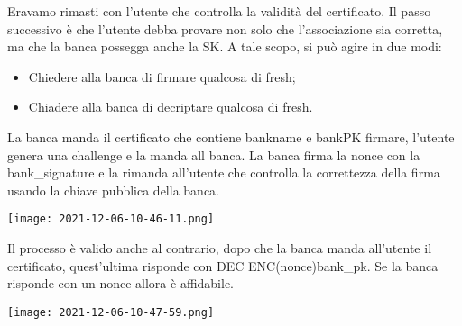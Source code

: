 \documentclass{article}
\theoremstyle{remark}
\begin{document}
Eravamo rimasti con l'utente che controlla la validità del certificato. Il passo successivo è che l'utente debba provare non solo che l'associazione sia corretta, ma che la banca possegga anche la SK. A tale scopo, si può agire in due modi:\begin{itemize}
	\item Chiedere alla banca di firmare qualcosa di fresh;
	\item Chiadere alla banca di decriptare qualcosa di fresh.
\end{itemize}
La banca manda il certificato che contiene bankname e bankPK firmare, l'utente genera una challenge e la manda all banca. La banca firma la nonce con la bank\_signature e la rimanda all'utente che controlla la correttezza della firma usando la chiave pubblica della banca.
\begin{center}
	\texttt{[image: 2021-12-06-10-46-11.png]}
\end{center}
Il processo è valido anche al contrario, dopo che la banca manda all'utente il certificato, quest'ultima risponde con DEC ENC(nonce)bank\_pk. Se la banca risponde con un nonce allora è affidabile.
\begin{center}
	\texttt{[image: 2021-12-06-10-47-59.png]}
\end{center}
\end{document}
